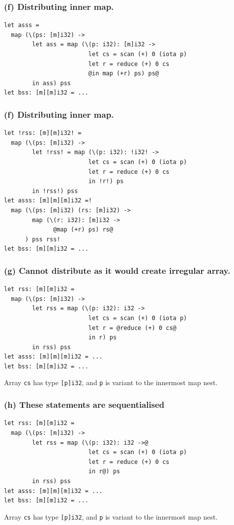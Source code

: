 \documentclass[rgb,dvipsnames]{beamer}
\begin{document}
\begin{frame}[t,fragile]
\frametitle{(f) Distributing inner map.}

\begin{lstlisting}[basicstyle=\sffamily\footnotesize]
let asss =
  map (\(ps: [m]i32) ->
        let ass = map (\(p: i32): [m]i32 ->
                        let cs = scan (+) 0 (iota p)
                        let r = reduce (+) 0 cs
                        @in map (+r) ps) ps@
        in ass) pss
let bss: [m][m]i32 = ...
\end{lstlisting}
\end{frame}

\begin{frame}[t,fragile]
\frametitle{(f) Distributing inner map.}

\begin{lstlisting}[basicstyle=\sffamily\footnotesize]
let !rss: [m][m]i32! =
  map (\(ps: [m]i32) ->
        let !rss! = map (\(p: i32): !i32! ->
                        let cs = scan (+) 0 (iota p)
                        let r = reduce (+) 0 cs
                        in !r!) ps
        in !rss!) pss
let asss: [m][m][m]i32 =!
  map (\(ps: [m]i32) (rs: [m]i32) ->
        map (\(r: i32): [m]i32 ->
              @map (+r) ps) rs@
      ) pss rss!
let bss: [m][m]i32 = ...
\end{lstlisting}
\end{frame}

\begin{frame}[t,fragile]
\frametitle{(g) Cannot distribute as it would create irregular array.}

\begin{lstlisting}[basicstyle=\sffamily\footnotesize]
let rss: [m][m]i32 =
  map (\(ps: [m]i32) ->
        let rss = map (\(p: i32): i32 ->
                        let cs = scan (+) 0 (iota p)
                        let r = @reduce (+) 0 cs@
                        in r) ps
        in rss) pss
let asss: [m][m][m]i32 = ...
let bss: [m][m]i32 = ...
\end{lstlisting}

Array \texttt{cs} has type \texttt{[p]i32}, and \texttt{p} is variant
to the innermost map nest.
\end{frame}

\begin{frame}[t,fragile]
\frametitle{(h) These statements are sequentialised}

\begin{lstlisting}[basicstyle=\sffamily\footnotesize]
let rss: [m][m]i32 =
  map (\(ps: [m]i32) ->
        let rss = map (\(p: i32): i32 ->@
                        let cs = scan (+) 0 (iota p)
                        let r = reduce (+) 0 cs
                        in r@) ps
        in rss) pss
let asss: [m][m][m]i32 = ...
let bss: [m][m]i32 = ...
\end{lstlisting}

Array \texttt{cs} has type \texttt{[p]i32}, and \texttt{p} is variant
to the innermost map nest.
\end{frame}
\end{document}
